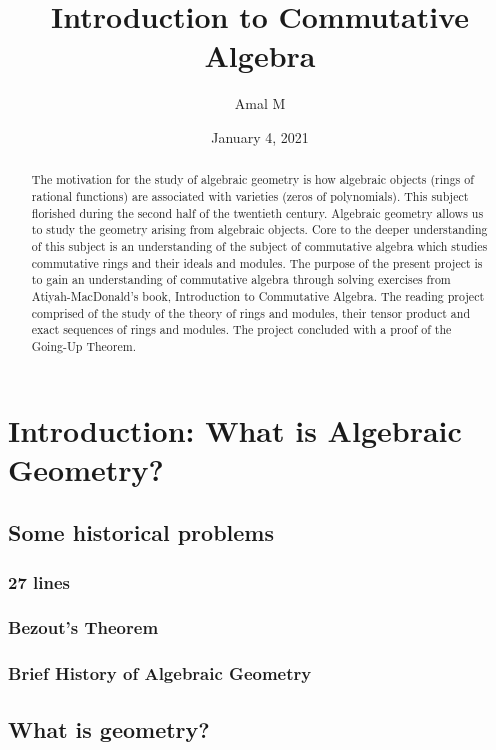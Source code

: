 \documentclass[]{report}
\begin{document}
\title{Introduction to Commutative Algebra}
\author{Amal M}
\date{January 4, 2021}
\maketitle

\begin{abstract}
    The motivation for the study of algebraic geometry is how algebraic objects (rings of rational functions) are associated with varieties (zeros of polynomials). This subject florished during the second half of the twentieth century. Algebraic geometry allows us to study the geometry arising from algebraic objects. Core to the deeper understanding of this subject is an understanding of the subject of commutative algebra which studies commutative rings and their ideals and modules. The purpose of the present project is to gain an understanding of commutative algebra through solving exercises from Atiyah-MacDonald's book, Introduction to Commutative Algebra. The reading project comprised of the study of the theory of rings and modules, their tensor product and exact sequences of rings and modules. The project concluded with a proof of the Going-Up Theorem.

\end{abstract}

\chapter{Introduction: What is Algebraic Geometry?} %
\section{Some historical problems}
\subsection{27 lines}
\subsection{Bezout's Theorem}
\subsection{Brief History of Algebraic Geometry}
\section{What is geometry?}
\end{document}
